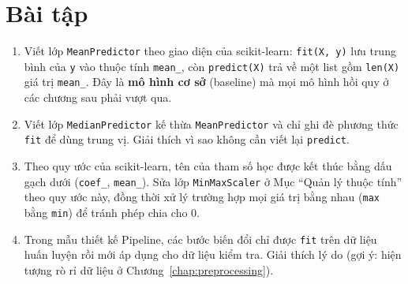 \section{Bài tập}
\begin{enumerate}
    \item Viết lớp \texttt{MeanPredictor} theo giao diện của scikit-learn: \texttt{fit(X, y)} lưu trung bình của \texttt{y} vào thuộc tính \texttt{mean\_}, còn \texttt{predict(X)} trả về một list gồm \texttt{len(X)} giá trị \texttt{mean\_}. Đây là \textbf{mô hình cơ sở} (baseline) mà mọi mô hình hồi quy ở các chương sau phải vượt qua.
    \item Viết lớp \texttt{MedianPredictor} kế thừa \texttt{MeanPredictor} và chỉ ghi đè phương thức \texttt{fit} để dùng trung vị. Giải thích vì sao không cần viết lại \texttt{predict}.
    \item Theo quy ước của scikit-learn, tên của tham số học được kết thúc bằng dấu gạch dưới (\texttt{coef\_}, \texttt{mean\_}). Sửa lớp \texttt{MinMaxScaler} ở Mục ``Quản lý thuộc tính'' theo quy ước này, đồng thời xử lý trường hợp mọi giá trị bằng nhau (\texttt{max} bằng \texttt{min}) để tránh phép chia cho 0.
    \item Trong mẫu thiết kế Pipeline, các bước biến đổi chỉ được \texttt{fit} trên dữ liệu huấn luyện rồi mới áp dụng cho dữ liệu kiểm tra. Giải thích lý do (gợi ý: hiện tượng rò rỉ dữ liệu ở Chương~\ref{chap:preprocessing}).
\end{enumerate}